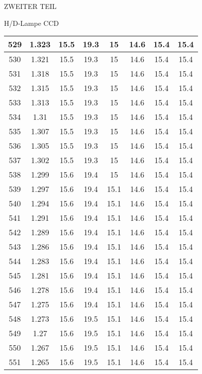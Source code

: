 \begin{appendix}
\begin{chapter}{ZWEITER TEIL}
\begin{section}{H/D-Lampe CCD}
\begin{scriptsize}
\begin{longtable}[htbp]{|c|c|c|c|c|c|c|c|}
            529 & 1.323 & 15.5 & 19.3 & 15 & 14.6 & 15.4 & 15.4 \\ \hline
            530 & 1.321 & 15.5 & 19.3 & 15 & 14.6 & 15.4 & 15.4 \\ \hline
            531 & 1.318 & 15.5 & 19.3 & 15 & 14.6 & 15.4 & 15.4 \\ \hline
            532 & 1.315 & 15.5 & 19.3 & 15 & 14.6 & 15.4 & 15.4 \\ \hline
            533 & 1.313 & 15.5 & 19.3 & 15 & 14.6 & 15.4 & 15.4 \\ \hline
            534 & 1.31 & 15.5 & 19.3 & 15 & 14.6 & 15.4 & 15.4 \\ \hline
            535 & 1.307 & 15.5 & 19.3 & 15 & 14.6 & 15.4 & 15.4 \\ \hline
            536 & 1.305 & 15.5 & 19.3 & 15 & 14.6 & 15.4 & 15.4 \\ \hline
            537 & 1.302 & 15.5 & 19.3 & 15 & 14.6 & 15.4 & 15.4 \\ \hline
            538 & 1.299 & 15.6 & 19.4 & 15 & 14.6 & 15.4 & 15.4 \\ \hline
            539 & 1.297 & 15.6 & 19.4 & 15.1 & 14.6 & 15.4 & 15.4 \\ \hline
            540 & 1.294 & 15.6 & 19.4 & 15.1 & 14.6 & 15.4 & 15.4 \\ \hline
            541 & 1.291 & 15.6 & 19.4 & 15.1 & 14.6 & 15.4 & 15.4 \\ \hline
            542 & 1.289 & 15.6 & 19.4 & 15.1 & 14.6 & 15.4 & 15.4 \\ \hline
            543 & 1.286 & 15.6 & 19.4 & 15.1 & 14.6 & 15.4 & 15.4 \\ \hline
            544 & 1.283 & 15.6 & 19.4 & 15.1 & 14.6 & 15.4 & 15.4 \\ \hline
            545 & 1.281 & 15.6 & 19.4 & 15.1 & 14.6 & 15.4 & 15.4 \\ \hline
            546 & 1.278 & 15.6 & 19.4 & 15.1 & 14.6 & 15.4 & 15.4 \\ \hline
            547 & 1.275 & 15.6 & 19.4 & 15.1 & 14.6 & 15.4 & 15.4 \\ \hline
            548 & 1.273 & 15.6 & 19.5 & 15.1 & 14.6 & 15.4 & 15.4 \\ \hline
            549 & 1.27 & 15.6 & 19.5 & 15.1 & 14.6 & 15.4 & 15.4 \\ \hline
            550 & 1.267 & 15.6 & 19.5 & 15.1 & 14.6 & 15.4 & 15.4 \\ \hline
            551 & 1.265 & 15.6 & 19.5 & 15.1 & 14.6 & 15.4 & 15.4 \\ \hline

\end{longtable}
\end{scriptsize}
\end{section}
\end{chapter}
\end{appendix}
